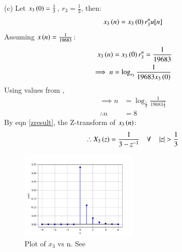 \documentclass[journal,12pt,twocolumn]{IEEEtran}
\theoremstyle{remark}
\begin{document}
(c) Let $x_3\left(0\right) = \frac{1}{3}$, $r_3 = \frac{1}{3}$, then:
\begin{align}
    x_3\left(n\right) = x_3\left(0\right) r_3^nu[n]
\end{align}
Assuming $x\left(n\right) = \frac{1}{19683}$: 
\begin{align}
    x_3\left(n\right) &= x_3\left(0\right) r_3^n = \frac{1}{19683}\\
    \implies n &= \log_{r_3}{\frac{1}{19683 x_3\left(0\right)}}
\end{align}
Using values from ,
\begin{align}
    \implies n &= \log_{\frac{1}{3}}{\frac{1}{19683 \frac{1}{3}}}\\
    \therefore n &= 8
\end{align}
By eqn \ref{zresult}, the Z-transform of $x_3\left(n\right)$:
\begin{align}
    \therefore X_3\left(z\right) = \frac{1}{3 - z^{-1}} \quad \forall \quad \left\vert z\right\vert > \frac{1}{3}
\end{align}

\begin{figure}[h!]
    \renewcommand\thefigure{3}
    \centering
    \includegraphics[width=0.5\textwidth]{figs/c.png}
    \caption[short]{Plot of $x_3$ vs n. See }
    \label{fig:img3}
\end{figure}


\end{document}
